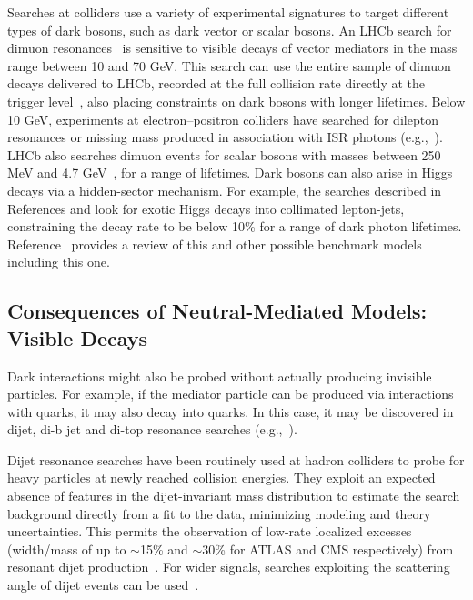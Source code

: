 \documentclass{ar-1col}
\newcommand{\IP}{invisible particle}
\begin{document}
Searches at colliders use a variety of experimental signatures to
target different types of dark bosons, such as dark vector or
scalar bosons. An LHCb search for dimuon
resonances~\cite{Aaij:2017rft} is sensitive to visible decays of
vector mediators in the mass range between 10 and 70 GeV. This
search can use the entire sample of dimuon decays delivered to
LHCb, recorded at the full collision rate directly at the trigger
level~\cite{Aaij:2016rxn}, also placing constraints on dark bosons with longer lifetimes. 
Below 10 GeV, experiments at
electron--positron colliders have searched for dilepton resonances
or missing mass produced in association with ISR photons (e.g.,~). 
LHCb also searches dimuon
events for scalar bosons with masses between 250 MeV and 4.7
GeV~\cite{Aaij:2016qsm}, for a range of lifetimes. Dark bosons can
also arise in Higgs decays via a hidden-sector mechanism. For
example, the searches described in References  and 
look for exotic Higgs decays into collimated lepton-jets,
constraining the decay rate to be below 10\% for a range of dark
photon lifetimes. Reference~ provides a review of this and other
possible benchmark models including this one.

\subsection{Consequences of Neutral-Mediated Models: Visible Decays}\label{sec:MediatorSearches} \label{sub:twoBody}

Dark interactions might also be probed without actually producing
{\IP}s. For example, if the mediator particle can be produced via
interactions with quarks, it may also decay into quarks. In this
case, it may be discovered in dijet, di-b jet and di-top resonance searches
(e.g.,~).

Dijet resonance searches have been routinely used at hadron
colliders to probe for heavy particles at newly reached collision
energies. They exploit an expected absence of features in the
dijet-invariant mass distribution to estimate the search
background directly from a fit to the data, minimizing modeling
and theory uncertainties. This permits the observation of low-rate
localized excesses (width/mass of up to $\sim$15\% and $\sim$30\%
for ATLAS and CMS respectively) from resonant
dijet production~\cite{Aaboud:2017yvp,Sirunyan:2018xlo}. For
wider signals, searches exploiting the scattering angle of dijet
events can be used~\cite{CMS-PAS-EXO-16-046,Aaboud:2017yvp}.
\end{document}
